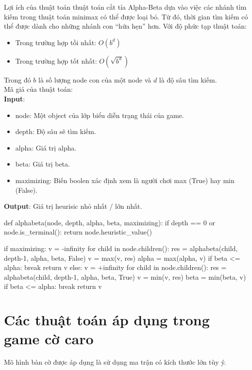 \documentclass[12pt]{report}
\begin{document}
Lợi ích của thuật toán thuật toán cắt tỉa Alpha-Beta dựa vào việc các nhánh tìm kiếm trong thuật toán minimax có thể được 
loại bỏ. Từ đó, thời gian tìm kiếm có thể được dành cho những nhánh con ``hứa hẹn'' hơn. Với độ phức tạp thuật toán: 
\begin{itemize}
    \item Trong trường hợp tồi nhất: $O(b^d)$
    \item Trong trường hợp tốt nhất: $O(\sqrt{b^d})$
\end{itemize}
Trong đó $b$ là số lượng node con của một node và $d$ là độ sâu tìm kiếm. \\[0.5cm]

\noindent
Mã giả của thuật toán: \\
\textbf{Input}:
\begin{itemize}
    \item node: Một object của lớp biểu diễn trạng thái của game. 
    \item depth: Độ sâu sẽ tìm kiếm. 
    \item alpha: Giá trị alpha. 
    \item beta: Giá trị beta. 
    \item maximizing: Biến boolen xác định xem là người chơi max (True) hay min (False). 
\end{itemize}
\textbf{Output}: Giá trị heurisic nhỏ nhất / lớn nhất. \\[0.5cm]
\begin{python}
def alphabeta(node, depth, alpha, beta, maximizing):
    if depth == 0 or node.is_terminal():
        return node.heuristic_value()

    if maximizing:
        v = -infinity
        for child in node.children():
            res = alphabeta(child, depth-1, alpha, beta, False)
            v = max(v, res)
            alpha = max(alpha, v)
            if beta <= alpha: 
                break 
        return v
    else:
        v = +infinity
        for child in node.children():
            res = alphabeta(child, depth-1, alpha, beta, True)
            v = min(v, res)
            beta = min(beta, v)
            if beta <= alpha:
                break
        return v
\end{python}

\section{Các thuật toán áp dụng trong game cờ caro}
Mô hình bàn cờ được áp dụng là sử dụng ma trận có kích thước lớn tùy ý. 
\end{document}
